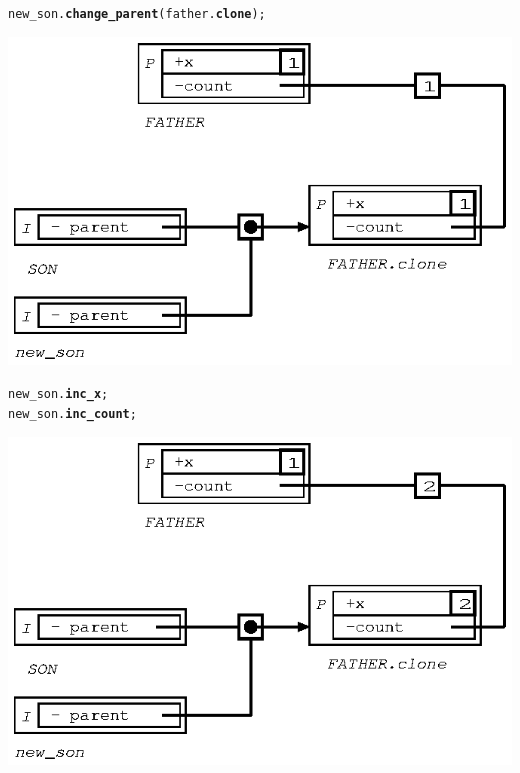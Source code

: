 \documentclass[11pt]{mybook}
\begin{document}
\begin{alltt}
  new\_son.{\bf{}change\_parent} ({\sc{}father}.{\bf{}clone});
\end{alltt}
\begin{center}
\includegraphics[scale=1.0]{figures/inherit_minus_3} 
\end{center}

\begin{alltt}
  new\_son.{\bf{}inc\_x};
  new\_son.{\bf{}inc\_count};
\end{alltt}
\begin{center}
\includegraphics[scale=1.0]{figures/inherit_minus_4} 
\end{center}
\end{document}

